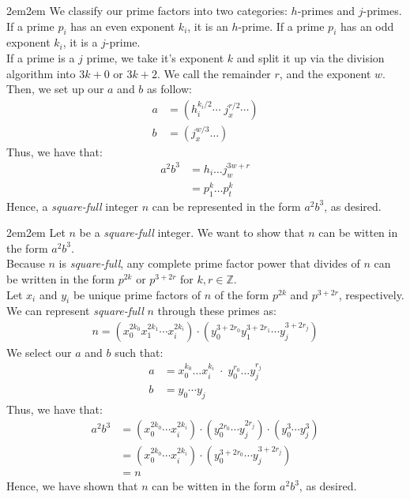 \documentclass[10pt,oneside]{book}
\newcommand{\Z}{\mathbb{Z}}\newcommand{\R}{\mathbb{R}}\newcommand{\N}{\mathbb{N}}
\newcommand{\gspc}{\vspace{0.13cm}} %
\newcommand{\gline}{\gspc\\} %
\let\endoldproof\endproof
\renewenvironment{proof}[1][\proofname]
  {\vspace{0.2cm}\begin{adjustwidth}{2em}{2em}
   \oldproof[#1]}
  {\endoldproof
\end{adjustwidth}}
\begin{document}
\begin{enumerate}
\begin{proof}
		We classify our prime factors into two categories: $h$-primes and $j$-primes. If a prime $p_i$ has an even exponent $k_i$, it is an $h$-prime. If a prime $p_i$ has an odd exponent $k_i$, it is a $j$-prime.\gline
		If a prime is a $j$ prime, we take it's exponent $k$ and split it up via the division algorithm into $3k + 0$ or $3k + 2$. We call the remainder $r$, and the exponent $w$. Then, we set up our $a$ and $b$ as follow:
		\begin{align*}
			a&= (h_i^{k_i/2}\cdots\; j_x^{r/2}\cdots)\\
			b&= (j_x^{w/3}\ldots)
		\end{align*}
		Thus, we have that:
		\begin{align*}
			a^2b^3 &= h_i\ldots j_w^{3w + r}\\
			&= p_1^k\ldots p_t^k
		\end{align*}
		Hence, a \textit{square-full} integer $n$ can be represented in the form $a^2b^3$, as desired. 
	\end{proof}
	\begin{proof}
		Let $n$ be a \textit{square-full} integer. We want to show that $n$ can be witten in the form $a^2b^3$. \gline
		Because $n$ is \textit{square-full}, any complete prime factor power that divides of $n$ can be written in the form $p^{2k}$ or $p^{3 + 2r}$ for $k,r\in \Z$. \gline
		Let $x_i$ and $y_i$ be unique prime factors of $n$ of the form $p^{2k}$ and $p^{3+2r}$, respectively. We can represent \textit{square-full} $n$ through these primes as:
		\begin{align*}
			n = (x_0^{2k_0}x_1^{2k_1}\cdots x_i^{2k_i}) \cdot (y_0^{3+2r_0}y_1^{3+2r_1}\cdots y_j^{3+2r_j})
		\end{align*}
		We select our $a$ and $b$ such that:
		\begin{align*}
			a &= x_0^{k_0} \ldots x_i^{k_i} \;\cdot\; y_0^{r_0}\ldots y_j^{r_j}\\
			b &= y_0 \cdots y_j
		\end{align*} 
		Thus, we have that:
		\begin{align*}
			a^2b^3 &= (x_0^{2k_0}\cdots x_i^{2k_i}) \cdot (y_0^{2r_0}\cdots y_j^{2r_j})\cdot (y_0^3 \cdots y_j^3)\\
			&=(x_0^{2k_0}\cdots x_i^{2k_i}) \cdot (y_0^{3+2r_0}\cdots y_j^{3+2r_j})\\
			&= n
		\end{align*}
		Hence, we have shown that $n$ can be witten in the form $a^2b^3$, as desired. 
	\end{proof}
\end{enumerate}
\end{document}
